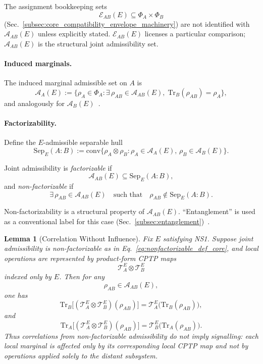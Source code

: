 \documentclass[aps,prx,onecolumn,11pt]{revtex4-2}
\theoremstyle{plain}
\newtheorem{lemma}{Lemma}
\theoremstyle{definition}
\theoremstyle{remark}
\begin{document}
The assignment bookkeeping sets
\[
\mathcal{E}_{AB}(E)\subseteq\Phi_A\times\Phi_B
\]
(Sec.~\ref{subsec:core_compatibility_envelope_machinery}) are not
identified with \(\mathcal{A}_{AB}(E)\) unless explicitly stated.
\(\mathcal{E}_{AB}(E)\) licenses a particular comparison;
\(\mathcal{A}_{AB}(E)\) is the structural joint admissibility set.

\paragraph{Induced marginals.}

The induced marginal admissible set on \(A\) is
\begin{equation}
\mathcal{A}_A(E)
:=
\{
\rho_A\in\Phi_A:
\exists\,\rho_{AB}\in\mathcal{A}_{AB}(E),\;
\mathrm{Tr}_B(\rho_{AB})=\rho_A
\},
\label{eq:marginals_def_core}
\end{equation}
and analogously for \(\mathcal{A}_B(E)\)~\cite{NielsenChuang2010,
Watrous2018}.

\paragraph{Factorizability.}

Define the \(E\)-admissible separable hull
\[
\mathrm{Sep}_E(A{:}B)
:=
\mathrm{conv}
\{
\rho_A\otimes\rho_B:
\rho_A\in\mathcal{A}_A(E),\,
\rho_B\in\mathcal{A}_B(E)
\}.
\]

Joint admissibility is \emph{factorizable} if
\begin{equation}
\mathcal{A}_{AB}(E)
\subseteq
\mathrm{Sep}_E(A{:}B),
\label{eq:factorizable_def_core}
\end{equation}
and \emph{non-factorizable} if
\begin{equation}
\exists\,\rho_{AB}\in\mathcal{A}_{AB}(E)
\quad\text{such that}\quad
\rho_{AB}\notin\mathrm{Sep}_E(A{:}B).
\label{eq:nonfactorizable_def_core}
\end{equation}

Non-factorizability is a structural property of
\(\mathcal{A}_{AB}(E)\). ``Entanglement'' is used as a conventional
label for this case
(Sec.~\ref{subsec:entanglement})~\cite{Bell1964,Horodecki2009,
Watrous2018}.

\begin{lemma}[Correlation Without Influence]
\label{lem:correlation_without_influence}
Fix \(E\) satisfying NS1. Suppose joint admissibility is
non-factorizable as in Eq.~\eqref{eq:nonfactorizable_def_core}, and
local operations are represented by product-form CPTP maps
\[
\mathcal{T}^E_A\otimes\mathcal{T}^E_B
\]
indexed only by \(E\). Then for any
\[
\rho_{AB}\in\mathcal{A}_{AB}(E),
\]
one has
\[
\mathrm{Tr}_B
\bigl[
(\mathcal{T}^E_A\otimes\mathcal{T}^E_B)
(\rho_{AB})
\bigr]
=
\mathcal{T}^E_A
\bigl(
\mathrm{Tr}_B(\rho_{AB})
\bigr),
\]
and
\[
\mathrm{Tr}_A
\bigl[
(\mathcal{T}^E_A\otimes\mathcal{T}^E_B)
(\rho_{AB})
\bigr]
=
\mathcal{T}^E_B
\bigl(
\mathrm{Tr}_A(\rho_{AB})
\bigr).
\]
Thus correlations from non-factorizable admissibility do not imply
signalling: each local marginal is affected only by its corresponding
local CPTP map and not by operations applied solely to the distant
subsystem.
\end{lemma}
\end{document}
